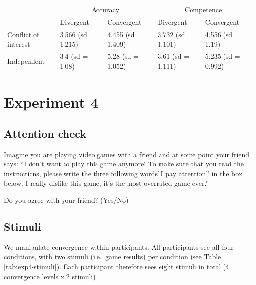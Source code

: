 \documentclass[
  doc,floatsintext]{apa6}
\begin{document}
\begin{table}
\centering
\caption{\label{tab:exp3-table}}
\centering
\begin{tabular}[t]{lllll}
\toprule
\multicolumn{1}{c}{} & \multicolumn{2}{c}{Accuracy} & \multicolumn{2}{c}{Competence} \\
\cmidrule(l{3pt}r{3pt}){2-3} \cmidrule(l{3pt}r{3pt}){4-5}
  & Divergent & Convergent & Divergent & Convergent\\
\midrule
Conflict of interest & 3.566 (sd = 1.215) & 4.455 (sd = 1.409) & 3.732 (sd = 1.101) & 4.556 (sd = 1.19)\\
Independent & 3.4 (sd = 1.08) & 5.28 (sd = 1.052) & 3.61 (sd = 1.111) & 5.235 (sd = 0.992)\\
\bottomrule
\end{tabular}
\end{table}

\clearpage

\section{Experiment 4}\label{exp4}

\FloatBarrier

\subsection{Attention check}\label{attention-check-3}

Imagine you are playing video games with a friend and at some point your friend says: ``I don't want to play this game anymore! To make sure that you read the instructions, please write the three following words''I pay attention'' in the box below. I really dislike this game, it's the most overrated game ever.''

Do you agree with your friend? (Yes/No)

\subsection{Stimuli}\label{stimuli-2}

We manipulate convergence within participants. All participants see all four conditions, with two stimuli (i.e.~game results) per condition (see Table \ref{tab:exp4-stimuli}). Each participant therefore sees eight stimuli in total (4 convergence levels x 2 stimuli)
\end{document}
